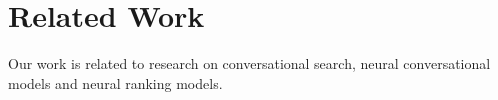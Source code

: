 \section{Related Work}
\label{sec:rel}



Our work is related to research on conversational search, neural conversational models and neural ranking models.



